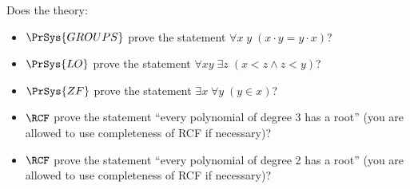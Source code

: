 Does the theory:
\begin{itemize}
    \item $\PrSys{GROUPS}$ prove the statement $\forall x\; y\; (x \cdot y = y \cdot x)$?
    \item $\PrSys{LO}$ prove the statement $\forall xy\; \exists z\; (x < z \wedge z < y)$?
    \item $\PrSys{ZF}$ prove the statement $\exists x \; \forall y\; (y \in x)$?
   	\item $\RCF$ prove the statement ``every polynomial of degree 3 has a root'' (you are allowed to use
        completeness of RCF if necessary)?
    \item $\RCF$ prove the statement ``every polynomial of degree 2 has a root'' (you are allowed to use
        completeness of RCF if necessary)?
\end{itemize}